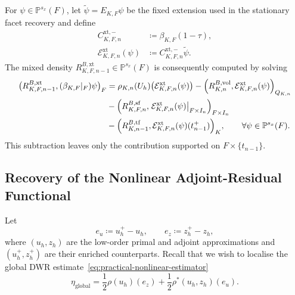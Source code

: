 For \(\psi\in\mathbb P^{s_x}(F)\), let \(\widetilde\psi=E_{K,F}\psi\) be the fixed extension used in the stationary facet recovery and define
\begin{equation}
  \begin{aligned}
  C_{K,F,n}^{\mathrm{xt},-}
  &\coloneqq
  \beta_{K,F}(1-\tau),
  \\
  \mathcal{E}_{K,F,n}^{\mathrm{xt}}(\psi)
  &\coloneqq
  C_{K,F,n}^{\mathrm{xt},-}\widetilde\psi.
  \end{aligned}
  \label{eq:mixed-ridge-test}
\end{equation}
The mixed density \(R_{K,F,n-1}^{B,\mathrm{xt}}\in\mathbb P^{s_x}(F)\) is consequently computed by solving
\begin{align}
  \bigl(
    R_{K,F,n-1}^{B,\mathrm{xt}},
    (\beta_{K,F}|_F)\psi
  \bigr)_F &=
  \rho_{K,n}(U_h)
  \bigl(\mathcal{E}_{K,F,n}^{\mathrm{xt}}(\psi)\bigr)
  -
  \Bigl(
    R_{K,n}^{B,\mathrm{vol}},
    \mathcal{E}_{K,F,n}^{\mathrm{xt}}(\psi)
  \Bigr)_{Q_{K,n}}
  \notag\\
  &-
  \Bigl(
    R_{K,F,n}^{B,\mathrm{sf}},
    \left.\mathcal{E}_{K,F,n}^{\mathrm{xt}}(\psi)\right|_{F\times I_n}
  \Bigr)_{F\times I_n}
  \notag\\
  &-
  \Bigl(
    R_{K,n-1}^{B,\mathrm{tf}},
    \mathcal{E}_{K,F,n}^{\mathrm{xt}}(\psi)(t_{n-1}^{+})
  \Bigr)_K,
  \qquad
  \forall\psi\in\mathbb P^{s_x}(F).
  \label{eq:mixed-ridge-recovery}
\end{align}
This subtraction leaves only the contribution supported on \(F\times\{t_{n-1}\}\).


\subsection{Recovery of the Nonlinear Adjoint-Residual Functional}
\label{sec:nonlinear-adjoint-residual-localisation}

Let
\begin{equation}
  e_u\coloneqq u_h^+-u_h,
  \qquad
  e_z\coloneqq z_h^+-z_h,
  \label{eq:nonlinear-dwr-discrete-errors}
\end{equation}
where $(u_h,z_h)$ are the low-order primal and adjoint approximations and $(u_h^+,z_h^+)$ are their enriched counterparts. 
Recall that we wish to localise the global DWR estimate~\eqref{eq:practical-nonlinear-estimator}
\[
\eta_{\mathrm{global}}
=
\frac12\rho(u_h)(e_z)
+
\frac12\rho^\ast(u_h,z_h)(e_u).
\]

